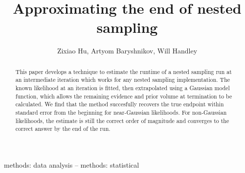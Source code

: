 \documentclass[usenatbib]{mnras}
\title[Approximating the end of nested sampling]{Approximating the end of nested sampling}
\author[Z. Hu et. al]{Zixiao Hu, Artyom Baryshnikov, Will Handley}
\begin{document}
\label{firstpage}
\pagerange{\pageref{firstpage}--\pageref{lastpage}}
\maketitle


\begin{abstract}
This paper develops a technique to estimate the runtime of a nested sampling run at an intermediate iteration which works for any nested sampling implementation. The known likelihood at an iteration is fitted, then extrapolated using a Gaussian model function, which allows the remaining evidence and prior volume at termination to be calculated. We find that the method succesfully recovers the true endpoint within standard error from the beginning for near-Gaussian likelihoods. For non-Gaussian likelihoods, the estimate is still the correct order of magnitude and converges to the correct answer by the end of the run.
\end{abstract}

\begin{keywords}
methods: data analysis -- methods: statistical
\end{keywords}
\end{document}
